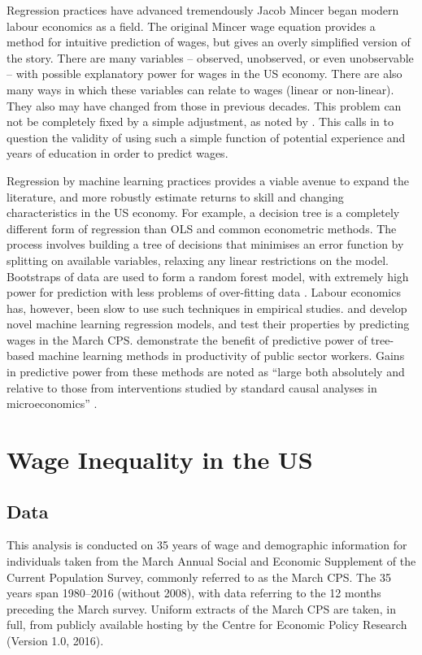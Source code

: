 \documentclass[notitlepage,12pt]{article}
\begin{document}
Regression practices have advanced tremendously Jacob Mincer began modern labour economics as a field.  The original Mincer wage equation provides a method for intuitive prediction of wages, but gives an overly simplified version of the story.  There are many variables -- observed, unobserved, or even unobservable -- with possible explanatory power for wages in the US economy.  There are also many ways in which these variables can relate to wages (linear or non-linear).  They also may have changed from those in previous decades.  This problem can not be completely fixed by a simple adjustment, as noted by \cite{lemieux2006increasing}.  This calls in to question the validity of using such a simple function of potential experience and years of education in order to predict wages.  

Regression by machine learning practices provides a viable avenue to expand the literature, and more robustly estimate returns to skill and changing characteristics in the US economy.  For example, a decision tree is a completely different form of regression than OLS and common econometric methods.  The process involves building a tree of decisions that minimises an error function by splitting on available variables, relaxing any linear restrictions on the model.  Bootstraps of data are used to form a random forest model, with extremely high power for prediction with less problems of over-fitting data \citep{breiman2001random}.  Labour economics  has, however, been slow to use such techniques in empirical studies.  \cite{belloni2011high} and \cite{abadie2017risk} develop novel machine learning regression models, and test their properties by predicting wages in the March CPS.  \cite{chalfin2016productivity} demonstrate the benefit of predictive power of tree-based machine learning methods in productivity of public sector workers.  Gains in predictive power from these methods are noted as ``large both absolutely and relative to those from interventions studied by standard causal analyses in microeconomics'' \cite[p.~126]{chalfin2016productivity}.

\section{Wage Inequality in the US}
\subsection{Data}
This analysis is conducted on 35 years of wage and demographic information for individuals taken from the March Annual Social and Economic Supplement of the Current Population Survey, commonly referred to as the March CPS.  The 35 years span 1980--2016 (without 2008), with data referring to the 12 months preceding the March survey.  Uniform extracts of the March CPS are taken, in full, from publicly available hosting by the Centre for Economic Policy Research \nocite{center} (Version 1.0, 2016).
\end{document}
